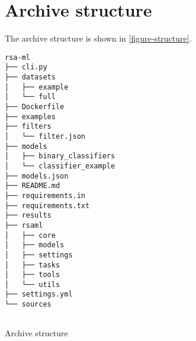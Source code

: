 \chapter{Archive structure}

The archive structure is shown in \autoref{figure-structure}.

\begin{listing}[ht]
\begin{verbatim}
rsa-ml
├── cli.py
├── datasets
│   ├── example
│   └── full
├── Dockerfile
├── examples
├── filters
│   └── filter.json
├── models
│   ├── binary_classifiers
│   └── classifier_example
├── models.json
├── README.md
├── requirements.in
├── requirements.txt
├── results
├── rsaml
│   ├── core
│   ├── models
│   ├── settings
│   ├── tasks
│   ├── tools
│   └── utils
├── settings.yml
└── sources
    
\end{verbatim}
\caption{Archive structure}
\label{figure-structure}
\end{listing}

